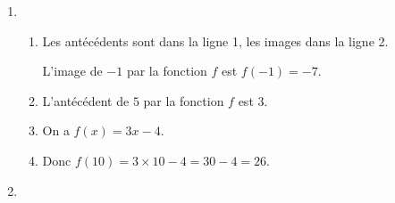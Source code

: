 
\medskip

\begin{enumerate}
\item %



	\begin{enumerate}
		\item Les antécédents sont dans la ligne 1, les images dans la ligne 2.
		
L'image de $- 1$ par la fonction $f$ est $f(-1)  = - 7$.
		\item %
L'antécédent de $5$ par la fonction $f$ est $3$.
		\item %
On a $f(x) = 3x - 4$.
		\item %
Donc $f(10) = 3 \times 10 - 4 = 30 - 4 = 26$.
 	\end{enumerate}
\item  %


\end{enumerate}
